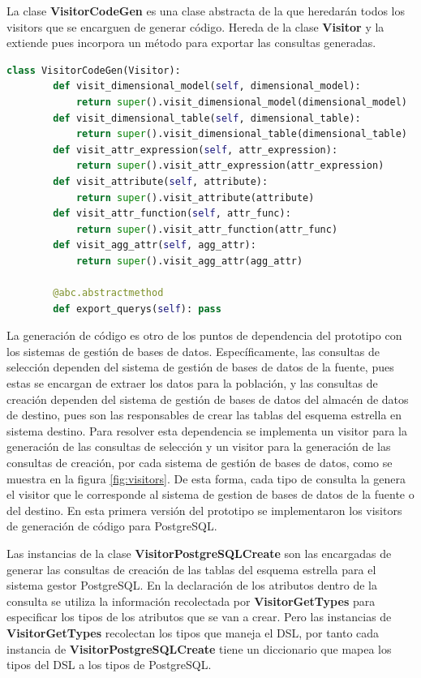 La clase \textbf{VisitorCodeGen} es una clase abstracta de la que heredar\'an todos los visitors que 
se encarguen de generar c\'odigo. Hereda de la clase \textbf{Visitor} y la extiende pues incorpora un 
m\'etodo para exportar las consultas generadas.

\begin{lstlisting}[label={code:vcodegen}, caption={Clase VisitorCodeGen}, language={python}]
    class VisitorCodeGen(Visitor):
        def visit_dimensional_model(self, dimensional_model):
            return super().visit_dimensional_model(dimensional_model)
        def visit_dimensional_table(self, dimensional_table):
            return super().visit_dimensional_table(dimensional_table)
        def visit_attr_expression(self, attr_expression):
            return super().visit_attr_expression(attr_expression)
        def visit_attribute(self, attribute):
            return super().visit_attribute(attribute)
        def visit_attr_function(self, attr_func):
            return super().visit_attr_function(attr_func)
        def visit_agg_attr(self, agg_attr):
            return super().visit_agg_attr(agg_attr)

        @abc.abstractmethod
        def export_querys(self): pass
\end{lstlisting}

La generaci\'on de c\'odigo es otro de los puntos de dependencia del prototipo con los sistemas de gesti\'on 
de bases de datos. Específicamente, las consultas de selecci\'on dependen del sistema de gestión de bases 
de datos de la fuente, pues estas se encargan de extraer los datos para la poblaci\'on, y las consultas 
de creaci\'on dependen del sistema de gestión de bases de datos del almac\'en de datos de destino, pues 
son las responsables de crear las tablas del esquema estrella en sistema destino. Para resolver esta dependencia 
se implementa un visitor para la generaci\'on de las consultas de selecci\'on y un visitor para la generaci\'on 
de las consultas de creaci\'on, por cada sistema de gesti\'on de bases de datos, como se muestra en la 
figura \ref{fig:visitors}. De esta forma, cada tipo de consulta la genera el visitor que le corresponde 
al sistema de gestion de bases de datos de la fuente o del destino. En esta primera versi\'on del prototipo 
se implementaron los visitors de generaci\'on de c\'odigo para PostgreSQL.

Las instancias de la clase \textbf{VisitorPostgreSQLCreate} son las encargadas de generar las 
consultas de creaci\'on de las tablas del esquema estrella para el sistema gestor PostgreSQL. En la 
declaraci\'on de los atributos 
dentro de la consulta se utiliza la informaci\'on recolectada por \textbf{VisitorGetTypes} para 
especificar los tipos de los atributos que se van a crear. Pero las instancias de \textbf{VisitorGetTypes} 
recolectan los tipos que maneja el DSL, por tanto cada instancia de \textbf{VisitorPostgreSQLCreate} 
tiene un diccionario que mapea los tipos del DSL a los tipos de PostgreSQL.

